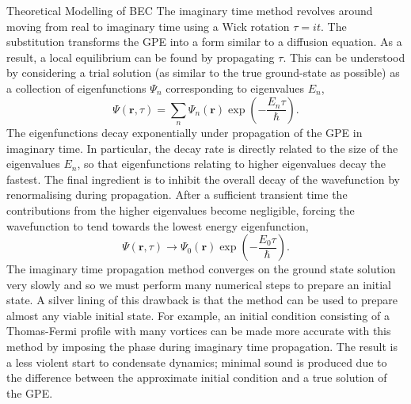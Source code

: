 \begin{chapter}{\label{cha:theoretical_model}Theoretical Modelling of BEC}
	The imaginary time method revolves around moving from real to imaginary time using a Wick rotation $\tau = it$. The substitution transforms the GPE into a form similar to a diffusion equation. As a result, a local equilibrium can be found by propagating $\tau$. This can be understood by considering a trial solution (as similar to the true ground-state as possible) as a collection of eigenfunctions $\Psi_n$ corresponding to eigenvalues $E_n$,
\begin{equation*}
\Psi(\mathbf{r},\tau) = \sum_n \Psi_n(\mathbf{r})\exp\left(-\frac{E_n\tau}{\hbar}\right).
\end{equation*}
The eigenfunctions decay exponentially under propagation of the GPE in imaginary time. In particular, the decay rate is directly related to the size of the eigenvalues $E_n$, so that eigenfunctions relating to higher eigenvalues decay the fastest. The final ingredient is to inhibit the overall decay of the wavefunction by renormalising during propagation. After a sufficient transient time the contributions from the higher eigenvalues become negligible, forcing the wavefunction to tend towards the lowest energy eigenfunction,
\begin{equation*}
\Psi(\mathbf{r},\tau) \rightarrow \Psi_0(\mathbf{r})\exp\left(-\frac{E_0\tau}{\hbar}\right).
\end{equation*}
The imaginary time propagation method converges on the ground state solution very slowly and so we must perform many numerical steps to prepare an initial state. A silver lining of this drawback is that the method can be used to prepare almost any viable initial state. For example, an initial condition consisting of a Thomas-Fermi profile with many vortices can be made more accurate with this method by imposing the phase during imaginary time propagation. The result is a less violent start to condensate dynamics; minimal sound is produced due to the difference between the approximate initial condition and a true solution of the GPE.


\end{chapter}
